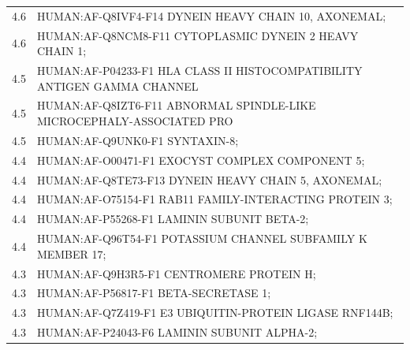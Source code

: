 \begin{table}[]
{\begin{tabular}{cl}
\rowcolor[HTML]{FCE4D6} 
4.6                                                 & HUMAN:AF-Q8IVF4-F14 DYNEIN HEAVY CHAIN 10, AXONEMAL;                     \\
\rowcolor[HTML]{F8CBAD} 
4.6                                                 & HUMAN:AF-Q8NCM8-F11 CYTOPLASMIC DYNEIN 2 HEAVY CHAIN 1;                  \\
\rowcolor[HTML]{FCE4D6} 
4.5                                                 & HUMAN:AF-P04233-F1 HLA CLASS II HISTOCOMPATIBILITY ANTIGEN GAMMA CHANNEL \\
\rowcolor[HTML]{F8CBAD} 
4.5                                                 & HUMAN:AF-Q8IZT6-F11 ABNORMAL SPINDLE-LIKE MICROCEPHALY-ASSOCIATED PRO    \\
\rowcolor[HTML]{FCE4D6} 
4.5                                                 & HUMAN:AF-Q9UNK0-F1 SYNTAXIN-8;                                           \\
\rowcolor[HTML]{F8CBAD} 
4.4                                                 & HUMAN:AF-O00471-F1 EXOCYST COMPLEX COMPONENT 5;                          \\
\rowcolor[HTML]{FCE4D6} 
4.4                                                 & HUMAN:AF-Q8TE73-F13 DYNEIN HEAVY CHAIN 5, AXONEMAL;                      \\
\rowcolor[HTML]{F8CBAD} 
4.4                                                 & HUMAN:AF-O75154-F1 RAB11 FAMILY-INTERACTING PROTEIN 3;                   \\
\rowcolor[HTML]{FCE4D6} 
4.4                                                 & HUMAN:AF-P55268-F1 LAMININ SUBUNIT BETA-2;                               \\
\rowcolor[HTML]{F8CBAD} 
4.4                                                 & HUMAN:AF-Q96T54-F1 POTASSIUM CHANNEL SUBFAMILY K MEMBER 17;              \\
\rowcolor[HTML]{FCE4D6} 
4.3                                                 & HUMAN:AF-Q9H3R5-F1 CENTROMERE PROTEIN H;                                 \\
\rowcolor[HTML]{F8CBAD} 
4.3                                                 & HUMAN:AF-P56817-F1 BETA-SECRETASE 1;                                     \\
\rowcolor[HTML]{FCE4D6} 
4.3                                                 & HUMAN:AF-Q7Z419-F1 E3 UBIQUITIN-PROTEIN LIGASE RNF144B;                  \\
\rowcolor[HTML]{F8CBAD} 
4.3                                                 & HUMAN:AF-P24043-F6 LAMININ SUBUNIT ALPHA-2;                              \\

\end{tabular}}
\end{table}
